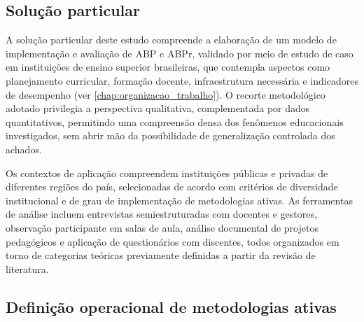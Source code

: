 \subsection{Solução particular}
\label{subsec:solucao_particular}

A solução particular deste estudo compreende a elaboração de um modelo de implementação e avaliação de ABP e ABPr, validado por meio de estudo de caso em instituições de ensino superior brasileiras, que contempla aspectos como planejamento curricular, formação docente, infraestrutura necessária e indicadores de desempenho (ver \ref{chap:organizacao_trabalho}). O recorte metodológico adotado privilegia a perspectiva qualitativa, complementada por dados quantitativos, permitindo uma compreensão densa dos fenômenos educacionais investigados, sem abrir mão da possibilidade de generalização controlada dos achados.

Os contextos de aplicação compreendem instituições públicas e privadas de diferentes regiões do país, selecionadas de acordo com critérios de diversidade institucional e de grau de implementação de metodologias ativas. As ferramentas de análise incluem entrevistas semiestruturadas com docentes e gestores, observação participante em salas de aula, análise documental de projetos pedagógicos e aplicação de questionários com discentes, todos organizados em torno de categorias teóricas previamente definidas a partir da revisão de literatura.

\subsection{Definição operacional de metodologias ativas}
\label{subsec:definicao_metodologias_ativas}

